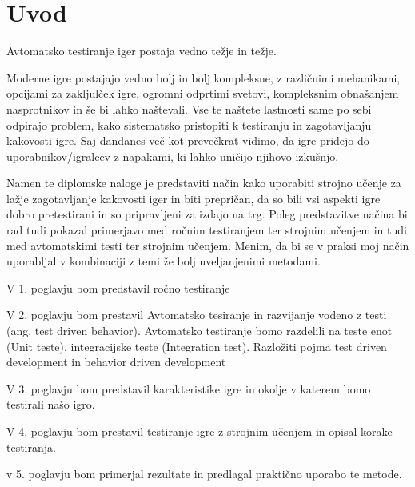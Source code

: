 
\mainmatter
\setcounter{page}{1}
\pagestyle{fancy}

\chapter{Uvod}
Avtomatsko testiranje iger postaja vedno težje in težje.

Moderne igre postajajo vedno bolj in bolj kompleksne, z različnimi mehanikami, opcijami za zakljulček igre, ogromni odprtimi svetovi, kompleksnim obnašanjem nasprotnikov in še bi lahko naštevali. 
Vse te naštete lastnosti same po sebi odpirajo problem, kako sistematsko pristopiti k testiranju in zagotavljanju kakovosti igre. Saj dandanes več kot prevečkrat vidimo, da igre pridejo do uporabnikov/igralcev z napakami, ki lahko uničijo njihovo izkušnjo.

Namen te diplomske naloge je predstaviti način kako uporabiti strojno učenje za lažje zagotavljanje kakovosti iger in biti prepričan, da so bili vsi aspekti igre dobro pretestirani in so pripravljeni za izdajo na trg.
Poleg predstavitve načina bi rad tudi pokazal primerjavo med ročnim testiranjem ter strojnim učenjem in tudi med avtomatskimi testi ter strojnim učenjem. Menim, da bi se v praksi moj način uporabljal v kombinaciji z temi že bolj uveljanjenimi metodami.

V 1. poglavju bom predstavil ročno testiranje 

V 2. poglavju bom prestavil Avtomatsko tesiranje in razvijanje vodeno z testi (ang. test driven behavior). Avtomatsko testiranje bomo razdelili na teste enot (Unit teste), integracijske teste (Integration test). Razložiti pojma test driven development in behavior driven development

V 3. poglavju bom predstavil karakteristike igre in okolje v katerem bomo testirali našo igro. 

V 4. poglavju bom prestavil testiranje igre z strojnim učenjem in opisal korake testiranja. 

v 5. poglavju bom primerjal rezultate in predlagal praktično uporabo te metode.